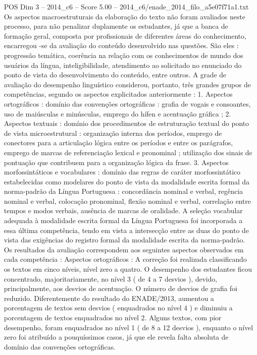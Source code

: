 \begin{textsample}{POS Dim 3 – 2014\_c6 – Score 5.00 – 2014\_c6/enade\_2014\_filo\_a5e07f71a1.txt}
Os aspectos macroestruturais da elaboração do texto não foram avaliados neste processo, para não penalizar duplamente os estudantes, já que a banca de formação geral, composta por profissionais de diferentes áreas do conhecimento, encarregou -se da avaliação do conteúdo desenvolvido nas questões.
São eles : progressão temática, coerência na relação com os conhecimentos de mundo dos usuários da língua, inteligibilidade, atendimento ao solicitado no enunciado do ponto de vista do desenvolvimento do conteúdo, entre outros.
A grade de avaliação do desempenho linguístico considerou, portanto, três grandes grupos de competências, segundo os aspectos explicitados anteriormente : 1.
Aspectos ortográficos : domínio das convenções ortográficas : grafia de vogais e consoantes, uso de maiúsculas e minúsculas, emprego do hífen e acentuação gráfica ; 2.
Aspectos textuais : domínio dos procedimentos de estruturação textual do ponto de vista microestrutural : organização interna dos períodos, emprego de conectores para a articulação lógica entre os períodos e entre os parágrafos, emprego de marcas de referenciação lexical e pronominal ; utilização dos sinais de pontuação que contribuem para a organização lógica da frase. 3.
Aspectos morfossintáticos e vocabulares : domínio das regras de caráter morfossintático estabelecidas como modelares do ponto de vista da modalidade escrita formal da norma-padrão da Língua Portuguesa : concordância nominal e verbal, regência nominal e verbal, colocação pronominal, flexão nominal e verbal, correlação entre tempos e modos verbais, ausência de marcas de oralidade.
A seleção vocabular adequada à modalidade escrita formal da Língua Portuguesa foi incorporada a essa última competência, tendo em vista a intersecção entre as duas do ponto de vista das exigências do registro formal da modalidade escrita da norma-padrão.
Os resultados da avaliação correspondem aos seguintes aspectos observados em cada competência : Aspectos ortográficos : A correção foi realizada classificando os textos em cinco níveis, nível zero a quatro.
O desempenho dos estudantes ficou concentrado, majoritariamente, no nível 3 ( de 4 a 7 desvios ), devido, principalmente, aos desvios de acentuação.
O número de desvios de grafia foi reduzido.
Diferentemente do resultado do ENADE/2013, aumentou a porcentagem de textos sem desvios ( enquadrados no nível 4 ) e diminuiu a porcentagem de textos enquadrados no nível 2.
Alguns textos, com pior desempenho, foram enquadrados no nível 1 ( de 8 a 12 desvios ), enquanto o nível zero foi atribuído a pouquíssimos casos, já que ele revela falta absoluta de domínio das convenções ortográficas.

\end{textsample}

